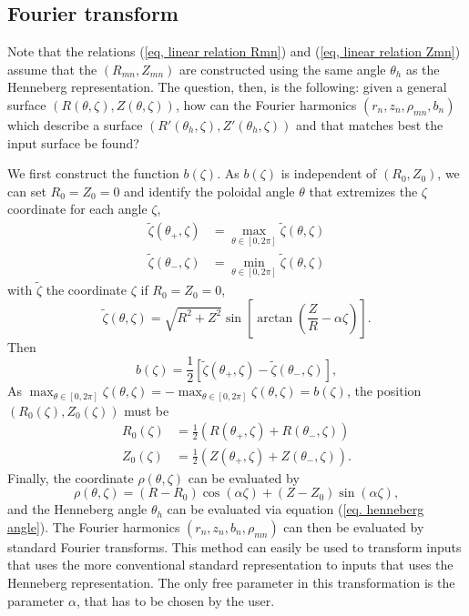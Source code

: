 \documentclass[my_thesis.tex]{subfiles}
\begin{document}
\subsection{Fourier transform}
Note that the relations (\ref{eq, linear relation Rmn}) and (\ref{eq, linear relation Zmn}) assume that the $(R_{mn},Z_{mn})$ are constructed using the same angle $\theta_h$ as the Henneberg representation. The question, then, is the following: given a general surface $(R(\theta,\zeta),Z(\theta,\zeta))$, how can the Fourier harmonics $(r_n,z_n,\rho_{mn},b_n)$ which describe a surface $(R'(\theta_h,\zeta),Z'(\theta_h,\zeta))$ and that matches best the input surface be found?

We first construct the function $b(\zeta)$. As $b(\zeta)$ is independent of $(R_0,Z_0)$, we can set $R_0=Z_0=0$ and identify the poloidal angle $\theta$ that extremizes the $\zeta$ coordinate for each angle $\zeta$,
\begin{align}
	\tilde\zeta(\theta_+,\zeta) &= \max_{\theta\in[0,2\pi]}\tilde\zeta(\theta,\zeta)\\
	\tilde\zeta(\theta_-,\zeta) &= \min_{\theta\in[0,2\pi]}\tilde\zeta(\theta,\zeta)
\end{align}
with $\tilde\zeta$ the coordinate $\zeta$ if $R_0=Z_0=0$,
\begin{equation}
	\tilde\zeta(\theta,\zeta) = \sqrt{R^2+Z^2}\sin\left[\arctan\left(\frac{Z}{R}-\alpha\zeta\right)\right].
\end{equation}
Then
\begin{equation}
	b(\zeta) = \frac{1}{2}\left[\tilde\zeta(\theta_+,\zeta)-\tilde\zeta(\theta_-,\zeta)\right],
\end{equation}
As $\max_{\theta\in[0,2\pi]}\zeta(\theta,\zeta)=-\max_{\theta\in[0,2\pi]}\zeta(\theta,\zeta)=b(\zeta)$, the position $(R_0(\zeta),Z_0(\zeta))$ must be 
\begin{align}
	R_0(\zeta) &= \frac{1}{2}\left(R(\theta_+,\zeta)+R(\theta_-,\zeta)\right)\\
	Z_0(\zeta) &= \frac{1}{2}\left(Z(\theta_+,\zeta)+Z(\theta_-,\zeta)\right).
\end{align}
Finally, the coordinate $\rho(\theta,\zeta)$ can be evaluated by
\begin{equation}
	\rho(\theta,\zeta) = (R-R_0)\cos(\alpha\zeta) + (Z-Z_0)\sin(\alpha\zeta),
\end{equation}
and the Henneberg angle $\theta_h$ can be evaluated via equation (\ref{eq. henneberg angle}). The Fourier harmonics $(r_n,z_n,b_n,\rho_{mn})$ can then be evaluated by standard Fourier transforms. This method can easily be used to transform inputs that uses the more conventional standard representation to inputs that uses the Henneberg representation. The only free parameter in this transformation is the parameter $\alpha$, that has to be chosen by the user. 
\end{document}
